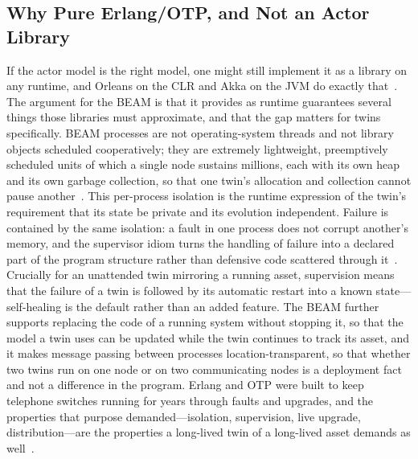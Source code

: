 \documentclass[conference]{IEEEtran}
\newcommand{\beam}{BEAM\xspace}
\newcommand{\otp}{OTP\xspace}
\begin{document}
\subsection{Why Pure Erlang/\otp, and Not an Actor Library}
If the actor model is the right model, one might still implement it as a library
on any runtime, and Orleans on the CLR and Akka on the JVM do exactly
that~\cite{orleans}. The argument for the \beam is that it provides as runtime
guarantees several things those libraries must approximate, and that the gap
matters for twins specifically. \beam processes are not operating-system
threads and not library objects scheduled cooperatively; they are extremely
lightweight, preemptively scheduled units of which a single node sustains
millions, each with its own heap and its own garbage collection, so that one
twin's allocation and collection cannot pause another~\cite{cesarini2016}. This
per-process isolation is the runtime expression of the twin's requirement that
its state be private and its evolution independent. Failure is contained by the
same isolation: a fault in one process does not corrupt another's memory, and
the supervisor idiom turns the handling of failure into a declared part of the
program structure rather than defensive code scattered through
it~\cite{armstrong2003,otpdesign}. Crucially for an unattended twin mirroring a
running asset, supervision means that the failure of a twin is followed by its
automatic restart into a known state---self-healing is the default rather than
an added feature. The \beam further supports replacing the code of a running
system without stopping it, so that the model a twin uses can be updated while
the twin continues to track its asset, and it makes message passing between
processes location-transparent, so that whether two twins run on one node or on
two communicating nodes is a deployment fact and not a difference in the
program. Erlang and \otp were built to keep telephone switches running for
years through faults and upgrades, and the properties that purpose
demanded---isolation, supervision, live upgrade, distribution---are the
properties a long-lived twin of a long-lived asset demands as
well~\cite{armstrong2003,cesarini2016}.
\end{document}
